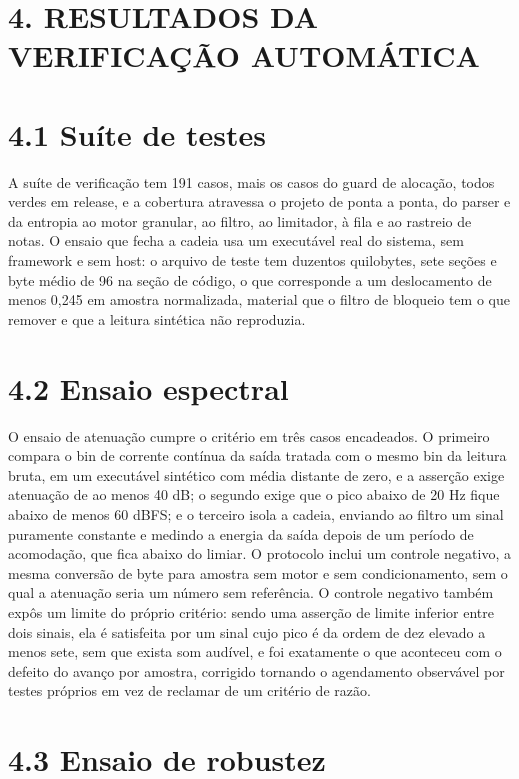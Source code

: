 \documentclass[11pt,a4paper]{article}
\begin{document}
\section*{4. RESULTADOS DA VERIFICAÇÃO AUTOMÁTICA}

\section*{4.1 Suíte de testes}

A suíte de verificação tem 191 casos, mais os casos do guard de alocação, todos verdes em release, e a cobertura atravessa o projeto de ponta a ponta, do parser e da entropia ao motor granular, ao filtro, ao limitador, à fila e ao rastreio de notas. O ensaio que fecha a cadeia usa um executável real do sistema, sem framework e sem host: o arquivo de teste tem duzentos quilobytes, sete seções e byte médio de 96 na seção de código, o que corresponde a um deslocamento de menos 0,245 em amostra normalizada, material que o filtro de bloqueio tem o que remover e que a leitura sintética não reproduzia.


\section*{4.2 Ensaio espectral}

O ensaio de atenuação cumpre o critério em três casos encadeados. O primeiro compara o bin de corrente contínua da saída tratada com o mesmo bin da leitura bruta, em um executável sintético com média distante de zero, e a asserção exige atenuação de ao menos 40 dB; o segundo exige que o pico abaixo de 20 Hz fique abaixo de menos 60 dBFS; e o terceiro isola a cadeia, enviando ao filtro um sinal puramente constante e medindo a energia da saída depois de um período de acomodação, que fica abaixo do limiar. O protocolo inclui um controle negativo, a mesma conversão de byte para amostra sem motor e sem condicionamento, sem o qual a atenuação seria um número sem referência. O controle negativo também expôs um limite do próprio critério: sendo uma asserção de limite inferior entre dois sinais, ela é satisfeita por um sinal cujo pico é da ordem de dez elevado a menos sete, sem que exista som audível, e foi exatamente o que aconteceu com o defeito do avanço por amostra, corrigido tornando o agendamento observável por testes próprios em vez de reclamar de um critério de razão.


\section*{4.3 Ensaio de robustez}
\end{document}
